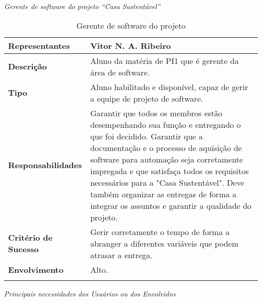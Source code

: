 \textit{Gerente de software do projeto “Casa Sustentável”}

\begin{longtable}{|m{5cm}|m{10cm}|}
	\hline \textbf{Representantes} & Vitor N. A. Ribeiro\\
	\hline \textbf{Descrição} & Aluno da matéria de PI1 que é gerente da área de software.\\
	\hline \textbf{Tipo} & Aluno habilitado e disponível, capaz de gerir a equipe de projeto de software.\\
	\hline \textbf{Responsabilidades} & Garantir que todos os membros estão desempenhando sua função e entregando o que
	 foi decidido. Garantir que a documentação e o processo de aquisição de software para automação seja corretamente
	 impregada e que satisfaça todos os requisitos necessários para a "Casa Sustentável". Deve também organizar as
	 entregas de forma a integrar os assuntos e garantir a qualidade do projeto.\\
	\hline \textbf{Critério de Sucesso} & Gerir corretamente o tempo de forma a abranger a diferentes variáveis que
	podem atrasar a entrega.\\
	\hline \textbf{Envolvimento} & Alto.\\
	\hline
\caption{Gerente de software do projeto}
\label{Gerente_de_software_do_projeto}
\end{longtable}

\textit{Principais necessidades dos Usuários ou dos Envolvidos}

